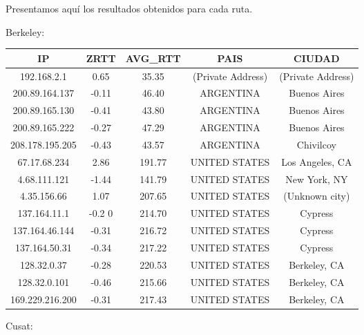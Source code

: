 Presentamos aquí los resultados obtenidos para cada ruta.

Berkeley:

\begin{tabular}{|c@{\hspace{5ex}}c@{\hspace{5ex}}c@{\hspace{5ex}}c@{\hspace{5ex}}c|}
 \hline
 \rule{0pt}{1.2em}IP & ZRTT & AVG\_RTT & PAIS & CIUDAD\\[0.2em]
 \hline

\rule{0pt}{1.2em} 192.168.2.1  &  0.65 & 35.35 & (Private Address) & (Private Address) \\[0.2em]
\rule{0pt}{1.2em} 200.89.164.137  &  -0.11 & 46.40 & ARGENTINA & Buenos Aires \\[0.2em]
\rule{0pt}{1.2em} 200.89.165.130  &  -0.41 & 43.80 & ARGENTINA & Buenos Aires \\[0.2em]
\rule{0pt}{1.2em} 200.89.165.222  &  -0.27 & 47.29 & ARGENTINA & Buenos Aires \\[0.2em]
\rule{0pt}{1.2em} 208.178.195.205  &  -0.43 & 43.57 & ARGENTINA & Chivilcoy \\[0.2em]
\rule{0pt}{1.2em} 67.17.68.234  &  2.86 & 191.77 & UNITED STATES & Los Angeles, CA \\[0.2em]
\rule{0pt}{1.2em} 4.68.111.121  &  -1.44 & 141.79 & UNITED STATES & New York, NY \\[0.2em]
\rule{0pt}{1.2em} 4.35.156.66  &  1.07 & 207.65 & UNITED STATES & (Unknown city) \\[0.2em]
\rule{0pt}{1.2em} 137.164.11.1  &  -0.2 0& 214.70 & UNITED STATES & Cypress \\[0.2em]
\rule{0pt}{1.2em} 137.164.46.144  &  -0.31 & 216.72 & UNITED STATES & Cypress \\[0.2em]
\rule{0pt}{1.2em} 137.164.50.31  &  -0.34 & 217.22 & UNITED STATES & Cypress \\[0.2em]
\rule{0pt}{1.2em} 128.32.0.37  &  -0.28 & 220.53 & UNITED STATES & Berkeley, CA \\[0.2em]
\rule{0pt}{1.2em} 128.32.0.101  &  -0.46 & 215.66 & UNITED STATES & Berkeley, CA \\[0.2em]
\rule{0pt}{1.2em} 169.229.216.200  &  -0.31 & 217.43 & UNITED STATES & Berkeley, CA \\[0.2em]
\hline
 \end{tabular}

Cusat:

